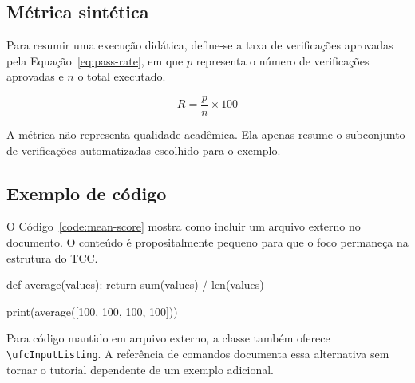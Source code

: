 \subsection{Métrica sintética}

Para resumir uma execução didática, define-se a taxa de verificações aprovadas pela Equação~\ref{eq:pass-rate}, em que $p$ representa o número de verificações aprovadas e $n$ o total executado.

\begin{equation}
  R = \frac{p}{n}\times 100
  \label{eq:pass-rate}
\end{equation}

A métrica não representa qualidade acadêmica. Ela apenas resume o subconjunto de verificações automatizadas escolhido para o exemplo.

\subsection{Exemplo de código}

O Código~\ref{code:mean-score} mostra como incluir um arquivo externo no documento. O conteúdo é propositalmente pequeno para que o foco permaneça na estrutura do TCC.

\lstset{language=Python,numbers=none}
\label{code:mean-score}
\begin{ufclisting}[here]
def average(values):
    return sum(values) / len(values)

print(average([100, 100, 100, 100]))
\end{ufclisting}

Para código mantido em arquivo externo, a classe também oferece \verb|\ufcInputListing|. A referência de comandos documenta essa alternativa sem tornar o tutorial dependente de um exemplo adicional.
